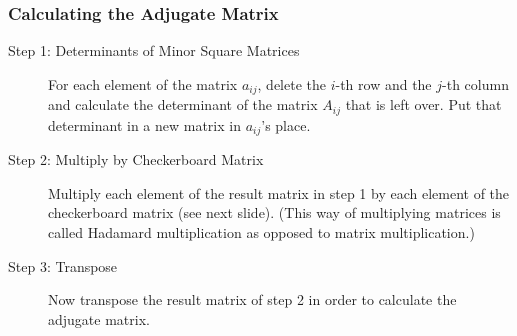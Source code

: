 \documentclass[xcolor=dvipsnames]{beamer}
\begin{document}
\begin{frame}
  \frametitle{Calculating the Adjugate Matrix}
  \begin{description}
  \item[Step 1: Determinants of Minor Square Matrices] For each
    element of the matrix $a_{ij}$, delete the $i$-th row and the
    $j$-th column and calculate the determinant of the matrix $A_{ij}$
    that is left over. Put that determinant in a new matrix in
    $a_{ij}$'s place.
  \item[Step 2: Multiply by Checkerboard Matrix] Multiply each element
    of the result matrix in step 1 by each element of the checkerboard
    matrix (see next slide). (This way of multiplying matrices is
    called Hadamard multiplication as opposed to matrix
    multiplication.)
  \item[Step 3: Transpose] Now transpose the result matrix of step 2
    in order to calculate the adjugate matrix.
  \end{description}
\end{frame}
\end{document}
